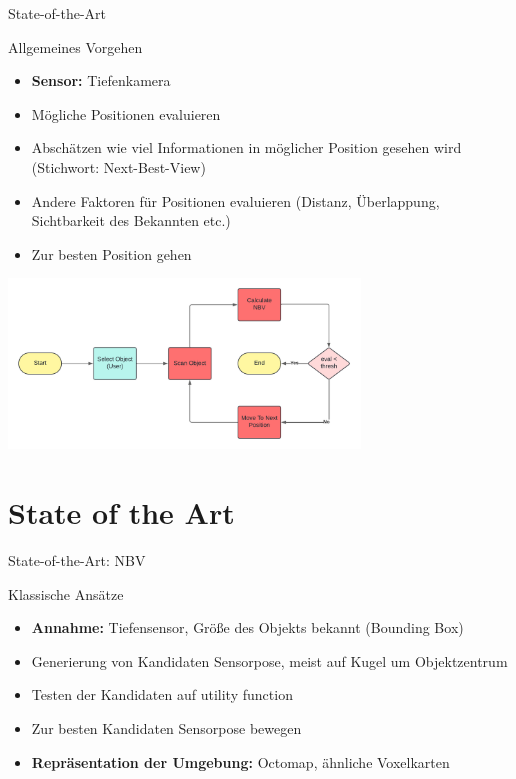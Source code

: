 \documentclass{beamer}
\begin{document}
\begin{frame}{State-of-the-Art}
	\begin{block}{Allgemeines Vorgehen}
		\begin{itemize}
			\item \textbf{Sensor:} Tiefenkamera
			\item Mögliche Positionen evaluieren
			\item Abschätzen wie viel Informationen in möglicher Position gesehen wird (Stichwort: Next-Best-View)
			\item Andere Faktoren für Positionen evaluieren (Distanz, Überlappung, Sichtbarkeit des Bekannten etc.)
			\item Zur besten Position gehen
		\end{itemize}
	\end{block}
	\begin{center}
		\includegraphics[width=0.7\textwidth]{Graphics/flow_chart.png}
	\end{center}
\end{frame}

\section{State of the Art}
\begin{frame}{State-of-the-Art: NBV}
	\begin{block}{Klassische Ansätze}
		\begin{itemize}
			\item \textbf{Annahme:} Tiefensensor, Größe des Objekts bekannt (Bounding Box)
			\item Generierung von Kandidaten Sensorpose, meist auf Kugel um Objektzentrum
			\item Testen der Kandidaten auf utility function
			\item Zur besten Kandidaten Sensorpose bewegen
			\item \textbf{Repräsentation der Umgebung:} Octomap, ähnliche Voxelkarten
		\end{itemize}
		\cite{zeng_view_2020}
	\end{block}
\end{frame}
\end{document}
